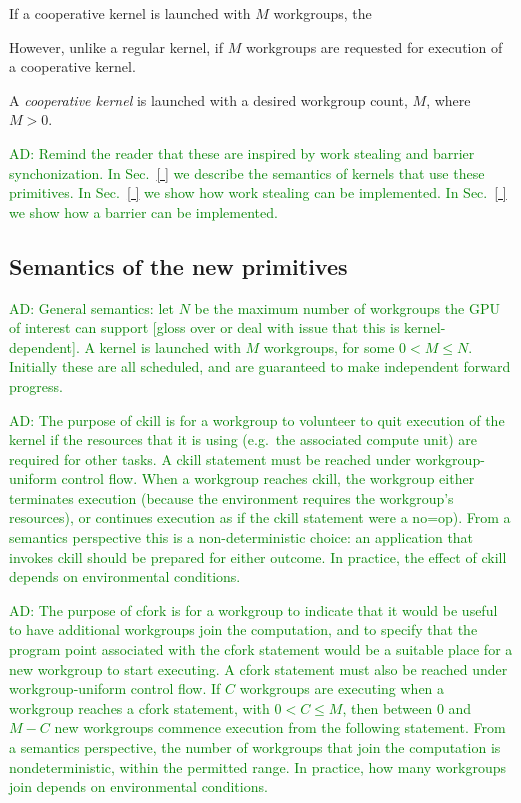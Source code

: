 \documentclass[nocopyrightspace]{sigplanconf-pldi16}
\newcommand{\ADComment}[1]{\textcolor{green}{AD: #1}}
\newcommand{\mysec}{Sec.~}
\begin{document}
If a cooperative kernel is launched with $M$ workgroups, the


However, unlike a regular kernel, if $M$ workgroups are requested for execution of a cooperative kernel.

A \emph{cooperative kernel} is launched with a desired workgroup
count, $M$, where $M > 0$.




\ADComment{Remind the reader that these are inspired by work stealing
  and barrier synchonization.  In \mysec\ref{ } we describe the
  semantics of kernels that use these primitives.  In \mysec\ref{ } we
  show how work stealing can be implemented.  In \mysec\ref{ } we show
  how a barrier can be implemented.}

\subsection{Semantics of the new primitives}

\ADComment{General semantics: let $N$ be the maximum number of
  workgroups the GPU of interest can support [gloss over or deal with
    issue that this is kernel-dependent].  A kernel is launched with
  $M$ workgroups, for some $0 < M \leq N$.  Initially these are all
  scheduled, and are guaranteed to make independent forward progress.}

\ADComment{The purpose of ckill is for a workgroup to volunteer to
  quit execution of the kernel if the resources that it is using
  (e.g.\ the associated compute unit) are required for other tasks.  A
  ckill statement must be reached under workgroup-uniform control
  flow.  When a workgroup reaches ckill, the workgroup either
  terminates execution (because the environment requires the
  workgroup's resources), or continues execution as if the ckill
  statement were a no=op).  From a semantics perspective this is a
  non-deterministic choice: an application that invokes ckill should
  be prepared for either outcome.  In practice, the effect of ckill
  depends on environmental conditions.}

\ADComment{The purpose of cfork is for a workgroup to indicate that it
  would be useful to have additional workgroups join the computation,
  and to specify that the program point associated with the cfork
  statement would be a suitable place for a new workgroup to start
  executing.  A cfork statement must also be reached under
  workgroup-uniform control flow.  If $C$ workgroups are executing
  when a workgroup reaches a cfork statement, with $0 < C \leq M$,
  then between 0 and $M-C$ new workgroups commence execution from the
  following statement.  From a semantics perspective, the number of
  workgroups that join the computation is nondeterministic, within the
  permitted range.  In practice, how many workgroups join depends on
  environmental conditions.}
\end{document}
